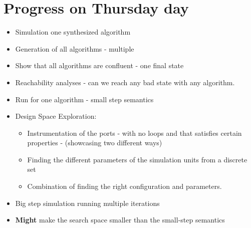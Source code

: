 \documentclass[runningheads]{llncs}
\begin{document}
\section{Progress on Thursday day}
\begin{itemize}
  \item Simulation one synthesized algorithm
  \item Generation of all algorithms - multiple
  \item Show that all algorithms are confluent - one final state
  \item Reachability analyses - can we reach any bad state with any algorithm.
  \item Run for one algorithm - small step semantics
  \item Design Space Exploration:
  \begin{itemize}
    \item Instrumentation of the ports - with no loops and that satisfies certain properties - (showcasing two different ways)
    \item Finding the different parameters of the simulation units from a discrete set
    \item Combination of finding the right configuration and parameters.
  \end{itemize}
  \item Big step simulation running multiple iterations
  \item \textbf{Might} make the search space smaller than the small-step semantics
\end{itemize}









%




%




\end{document}
